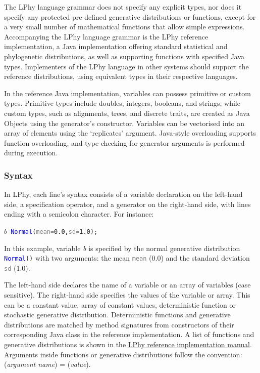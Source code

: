 \documentclass[10pt,letterpaper,table]{article}
\theoremstyle{definition}
\begin{document}
The LPhy language grammar does not specify any explicit types, nor does it specify any protected pre-defined generative distributions or functions, except for a very small number of mathematical functions that allow simple expressions. 
Accompanying the LPhy language grammar is the LPhy reference implementation, a Java implementation offering standard statistical and phylogenetic distributions, as well as supporting functions with specified Java types.
Implementers of the LPhy language in other systems should support the reference distributions, using equivalent types in their respective languages.

In the reference Java implementation, variables can possess primitive or custom types. 
Primitive types include doubles, integers, booleans, and strings, while custom types, such as alignments, trees, and discrete traits, are created as Java Objects using the generator's constructor. 
Variables can be vectorised into an array of elements using the `replicates' argument. 
Java-style overloading supports function overloading, and type checking for generator arguments is performed during execution.


\subsubsection{Syntax}
In LPhy, each line's syntax consists of a variable declaration on the left-hand side, a specification operator, and a generator on the right-hand side, with lines ending with a semicolon character. 
For instance:
{
  \small
  \begin{listing}
    \begin{alltt}
    \textcolor{bluishgreen}{\(b\)}  ~ \textcolor{blue}{Normal}(\textcolor{gray}{mean=} \textcolor{constant}{0.0}, \textcolor{gray}{sd=}\textcolor{constant}{1.0});
    \end{alltt}
  \end{listing}
}

In this example, variable \textit{\textcolor{bluishgreen}{b}} is specified by the normal generative distribution \texttt{\textcolor{blue}{Normal}()} with two arguments: the mean \texttt{\textcolor{gray}{mean}} (0.0) and the standard deviation \texttt{\textcolor{gray}{sd}} (1.0).

The left-hand side declares the name of a variable or an array of variables (case sensitive).
The right-hand side specifies the values of the variable or array. 
This can be a constant value, array of constant values, deterministic function or stochastic generative distribution.
Deterministic functions and generative distributions are matched by method signatures from constructors of their corresponding Java class in the reference implementation. 
A list of functions and generative distributions is shown in the \href{https://github.com/LinguaPhylo/linguaPhylo/blob/1.4.1-docs/lphy/doc/index.md}{LPhy reference implementation manual}.
Arguments inside functions or generative distributions follow the convention: 
(\textit{argument name}) = (\textit{value}).
\end{document}
